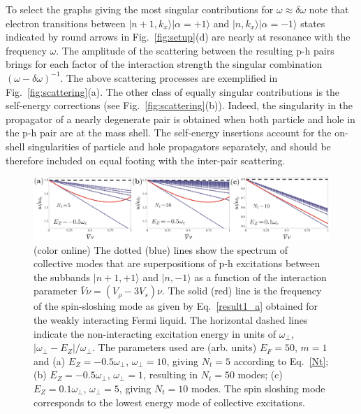 To select the graphs giving the most singular contributions for $\omega \approx \delta \omega$ note that electron transitions between $|n+1,k_x\rangle |\alpha=+1 \rangle$ and $|n,k_x\rangle |\alpha=-1 \rangle$ states indicated by round arrows in Fig.~\ref{fig:setup}(d) are nearly at resonance with the frequency $\omega$. 
The amplitude of the scattering between the resulting p-h pairs brings for each factor of the interaction strength the singular combination $(\omega - \delta \omega)^{-1}$.
The above scattering processes are exemplified in Fig.~\ref{fig:scattering}(a).
The other class of equally singular contributions is the self-energy corrections (see Fig.~\ref{fig:scattering}(b)).
Indeed, the singularity in the propagator of a nearly degenerate pair is obtained when both particle and hole in the p-h pair are at the mass shell.
The self-energy insertions account for the on-shell singularities of particle and hole propagators separately, and should be therefore included on equal footing with the inter-pair scattering.


\begin{figure}[ht]
\begin{center}
\includegraphics[width=0.9\columnwidth]{fig4.pdf}
\caption{ (color online) The dotted (blue) lines show the spectrum of collective modes that are superpositions of p-h excitations between the subbands $|n+1,+1\rangle$ and $|n,-1\rangle$ as a function of the interaction parameter $\bar{V} \nu =(V_{\rho} - 3 V_s) \nu$.
The solid (red) line is the frequency of the spin-sloshing mode as given by Eq.~\eqref{result1_a} obtained for the weakly interacting Fermi liquid. 
The horizontal dashed lines indicate the non-interacting excitation energy in units of $\omega_{\perp}$, $|\omega_{\perp} - E_Z|/\omega_{\perp}$.
The parameters used are (arb. units) $E_F = 50$,  $m=1$ and (a) $E_Z = -0.5 \omega_{\perp}$, $\omega_{\perp} = 10$, giving $N_t = 5$ according to Eq.~\eqref{Nt}; (b) $E_Z = -0.5 \omega_{\perp}$, $\omega_{\perp} = 1$, resulting in $N_t=50$ modes;
(c) $E_Z = 0.1 \omega_{\perp}$, $\omega_{\perp} = 5$, giving $N_t = 10$ modes.
The spin sloshing mode corresponds to the lowest energy mode of collective excitations.\cite{Iqbal}}
\label{fig:res1}
\end{center}
\end{figure}




